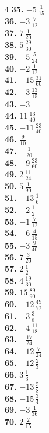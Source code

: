 \documentclass[11pt]{article}
\begin{document}
\begin{multicols}{4}
\textbf{35.} $-5\,\frac{1}{15}$\\
\textbf{36.} $-3\,\frac{7}{12}$\\
\textbf{37.} $7\,\frac{1}{20}$\\
\textbf{38.} $5\,\frac{29}{30}$\\
\textbf{39.} $-5\,\frac{5}{24}$\\
\textbf{40.} $-2\,\frac{1}{12}$\\
\textbf{41.} $-15\,\frac{31}{60}$\\
\textbf{42.} $-3\,\frac{13}{15}$\\
\textbf{43.} $-3$\\
\textbf{44.} $11\,\frac{13}{40}$\\
\textbf{45.} $-11\,\frac{23}{40}$\\
\textbf{46.} $\frac{9}{10}$\\
\textbf{47.} $-\frac{1}{20}$\\
\textbf{48.} $-9\,\frac{23}{60}$\\
\textbf{49.} $2\,\frac{11}{24}$\\
\textbf{50.} $5\,\frac{1}{90}$\\
\textbf{51.} $-13\,\frac{1}{6}$\\
\textbf{52.} $-2\,\frac{1}{2}$\\
\textbf{53.} $-1\,\frac{7}{12}$\\
\textbf{54.} $-6\,\frac{4}{15}$\\
\textbf{55.} $-3\,\frac{9}{40}$\\
\textbf{56.} $7\,\frac{3}{20}$\\
\textbf{57.} $2\,\frac{1}{2}$\\
\textbf{58.} $4\,\frac{19}{30}$\\
\textbf{59.} $15\,\frac{89}{90}$\\
\textbf{60.} $-12\,\frac{49}{72}$\\
\textbf{61.} $-3\,\frac{3}{8}$\\
\textbf{62.} $-4\,\frac{11}{18}$\\
\textbf{63.} $-\frac{17}{24}$\\
\textbf{64.} $-12\,\frac{7}{24}$\\
\textbf{65.} $-12\,\frac{2}{3}$\\
\textbf{66.} $3\,\frac{1}{3}$\\
\textbf{67.} $-13\,\frac{5}{8}$\\
\textbf{68.} $-15\,\frac{3}{4}$\\
\textbf{69.} $-3\,\frac{1}{36}$\\
\textbf{70.} $2\,\frac{2}{15}$\\

\end{multicols}
\end{document}
